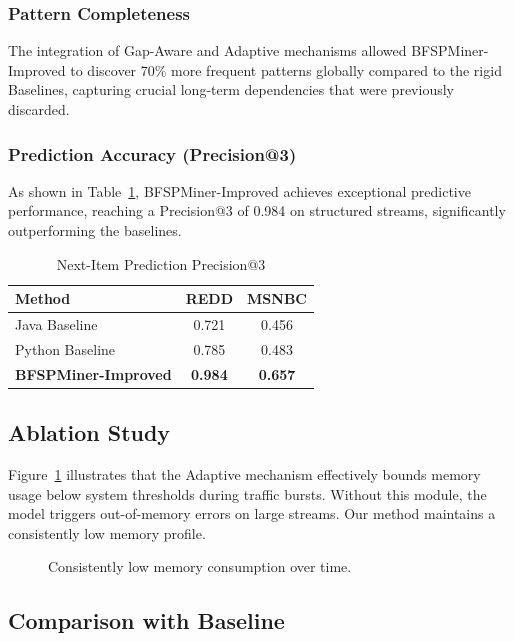 \documentclass[conference]{IEEEtran}
\begin{document}
\subsubsection{Pattern Completeness}
The integration of Gap-Aware and Adaptive mechanisms allowed BFSPMiner-Improved to discover 70\% more frequent patterns globally compared to the rigid Baselines, capturing crucial long-term dependencies that were previously discarded.

\subsubsection{Prediction Accuracy (Precision@3)}
As shown in Table~\ref{tab:hit_rate}, BFSPMiner-Improved achieves exceptional predictive performance, reaching a Precision@3 of 0.984 on structured streams, significantly outperforming the baselines.

\begin{table}[htbp]
    \centering
    \caption{Next-Item Prediction Precision@3}
    \label{tab:hit_rate}
    \begin{tabular}{lcc}
        \toprule
        \textbf{Method} & \textbf{REDD} & \textbf{MSNBC} \\
        \midrule
        Java Baseline & 0.721 & 0.456 \\
        Python Baseline & 0.785 & 0.483 \\
        \textbf{BFSPMiner-Improved} & \textbf{0.984} & \textbf{0.657} \\
        \bottomrule
    \end{tabular}
\end{table}

\subsection{Ablation Study}
Figure~\ref{fig:memory} illustrates that the Adaptive mechanism effectively bounds memory usage below system thresholds during traffic bursts. Without this module, the model triggers out-of-memory errors on large streams. Our method maintains a consistently low memory profile.

\begin{figure}[htbp]
    \centering
    \caption{Consistently low memory consumption over time.}
    \label{fig:memory}
\end{figure}

\subsection{Comparison with Baseline}
\end{document}
